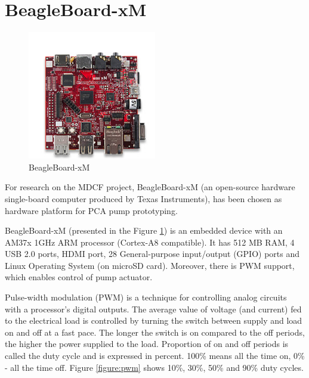 \section{BeagleBoard-xM}
\label{pcapump:beagleboard}

\begin{figure}
  \begin{center}
    \includegraphics[width=0.5\textwidth]{figures/beagleboard_xm.png}
  \end{center}
  \caption{BeagleBoard-xM}
  \label{figure:beagleboard_xm}
\end{figure}

For research on the MDCF project, BeagleBoard-xM (an open-source hardware single-board computer produced by Texas Instruments), has been chosen as hardware platform for PCA pump prototyping.

BeagleBoard-xM (presented in the Figure \ref{figure:beagleboard_xm}) is an embedded device with an AM37x 1GHz ARM processor (Cortex-A8 compatible). It has 512 MB RAM, 4 USB 2.0 ports, HDMI port, 28 General-purpose input/output (GPIO) ports and Linux Operating System (on microSD card). Moreover, there is PWM support, which enables control of pump actuator.

Pulse-width modulation (PWM) is a technique for controlling analog circuits with a processor's digital outputs. The average value of voltage (and current) fed to the electrical load is controlled by turning the switch between supply and load on and off at a fast pace. The longer the switch is on compared to the off periods, the higher the power supplied to the load. Proportion of on and off periods is called the duty cycle and is expressed in percent. 100\% means all the time on, 0\% - all the time off. Figure \ref{figure:pwm} shows 10\%, 30\%, 50\% and 90\% duty cycles.

